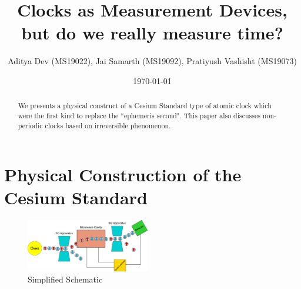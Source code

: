 \documentclass[%
 aapm,
 mph,%
 amsmath,amssymb,
 reprint,%
]{revtex4-2}
\begin{document}
\title[PHY401 TermPaper: Spring Semester 2022]{Clocks as Measurement Devices, but do we really measure time?}

\author{Aditya Dev (MS19022), Jai Samarth (MS19092), Pratiyush Vashisht (MS19073)}
%


\date{\today}%

\begin{abstract}
We presents a physical construct of a Cesium Standard type of atomic clock which were the first kind to replace the ``ephemeris second". This paper also discusses non-periodic clocks based on irreversible phenomenon. 
\end{abstract}

\maketitle
\tableofcontents

\vspace{10pt}

\section{Physical Construction of the Cesium Standard}

\begin{figure}[ht]
    \centering
    \includegraphics[width =0.48\textwidth]{rect1076.png}
    \caption{Simplified Schematic}
\end{figure}
\end{document}
